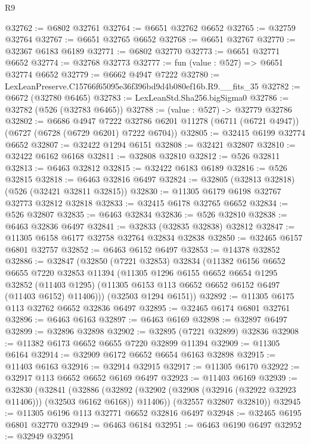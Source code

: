 \begin{lexlean}{R9}
\begin{coremodule}
@32762 := @6802 @32761
@32764 := @6651 @32762 @6652
@32765 := @32759 @32764
@32767 := @6651 @32765 @6652
@32768 := @6651 @32767
@32770 := @32367 @6183 @6189
@32771 := @6802 @32770
@32773 := @6651 @32771 @6652
@32774 := @32768 @32773
@32777 := fun (value : @527) => @6651 @32774 @6652
@32779 := @6662 @4947 @7222
@32780 := LexLeanPreserve.C15766f65095e36f396bd9d4b080ef16b.R9.__fits_35
@32782 := @6672 (@32780 @6465)
@32783 := LexLeanStd.Sha256.bigSigma0
@32786 := @32782 (@526 (@32783 @6465))
@32788 := (value : @527) -> @32779 @32786
@32802 := @6686
    @4947
    @7222
    @32786
    @6201
    @11278
    (@6711 (@6721 @4947))
    (@6727 (@6728 (@6729 @6201) @7222 @6704))
@32805 := @32415 @6199 @32774 @6652
@32807 := @32422 @1294 @6151
@32808 := @32421 @32807
@32810 := @32422 @6162 @6168
@32811 := @32808 @32810
@32812 := @526 @32811
@32813 := @6463 @32812
@32815 := @32422 @6183 @6189
@32816 := @526 @32815
@32818 := @6463 @32816 @6497
@32824 := @32805 (@32813 @32818) (@526 (@32421 @32811 @32815))
@32830 := @11305 @6179 @6198 @32767 @32773 @32812 @32818
@32833 := @32415 @6178 @32765 @6652
@32834 := @526 @32807
@32835 := @6463 @32834
@32836 := @526 @32810
@32838 := @6463 @32836 @6497
@32841 := @32833 (@32835 @32838) @32812
@32847 := @11305 @6158 @6177 @32758 @32764 @32834 @32838
@32850 := @32465 @6157 @6801 @32757
@32852 := @6463 @6152 @6497
@32853 := @14378 @32852
@32886 := @32847
    (@32850
      (@7221 @32853)
      @32834
      (@11382
        @6156
        @6652
        @6655
        @7220
        @32853
        @11394
        (@11305
          @1296
          @6155
          @6652
          @6654
          @1295
          @32852
          (@11403 @1295)
          (@11305 @6153 @113 @6652 @6652 @6152 @6497 (@11403 @6152) @11406)))
      (@32503 @1294 @6151))
@32892 := @11305 @6175 @113 @32762 @6652 @32836 @6497
@32895 := @32465 @6174 @6801 @32761
@32896 := @6463 @6163
@32897 := @6463 @6169
@32898 := @32897 @6497
@32899 := @32896 @32898
@32902 := @32895 (@7221 @32899) @32836
@32908 := @11382 @6173 @6652 @6655 @7220 @32899 @11394
@32909 := @11305 @6164
@32914 := @32909 @6172 @6652 @6654 @6163 @32898
@32915 := @11403 @6163
@32916 := @32914 @32915
@32917 := @11305 @6170
@32922 := @32917 @113 @6652 @6652 @6169 @6497
@32923 := @11403 @6169
@32939 := @32830
    (@32841
      (@32886
        (@32892 (@32902 (@32908 (@32916 (@32922 @32923 @11406))) (@32503 @6162 @6168)) @11406))
      (@32557 @32807 @32810))
@32945 := @11305 @6196 @113 @32771 @6652 @32816 @6497
@32948 := @32465 @6195 @6801 @32770
@32949 := @6463 @6184
@32951 := @6463 @6190 @6497
@32952 := @32949 @32951

\end{coremodule}
\end{lexlean}
